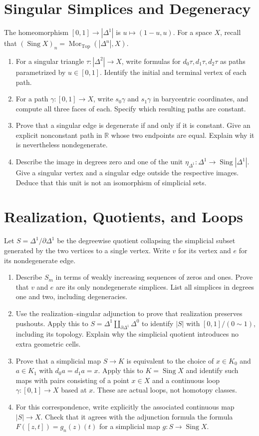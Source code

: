 \documentclass[11pt]{article}
\newcounter{result}[section]
\newcommand{\R}{\mathbb R}
\newcommand{\Top}{\mathrm{Top}}
\newcommand{\Sing}{\operatorname{Sing}}
\newcommand{\Mor}{\operatorname{Mor}}
\begin{document}
\section{Singular Simplices and Degeneracy}\label{ex:singular}
The homeomorphism $[0,1]\to|\Delta^1|$ is $u\mapsto(1-u,u)$.
For a space $X$, recall that $(\Sing X)_n=\Mor_\Top(|\Delta^n|,X)$.
\begin{enumerate}
\item For a singular triangle $\tau:|\Delta^2|\to X$, write formulas
for $d_0\tau,d_1\tau,d_2\tau$ as paths parametrized by $u\in[0,1]$.
Identify the initial and terminal vertex of each path.
\item For a path $\gamma:[0,1]\to X$, write $s_0\gamma$ and
$s_1\gamma$ in barycentric coordinates, and compute all three faces
of each. Specify which resulting paths are constant.
\item Prove that a singular edge is degenerate if and only if it is
constant. Give an explicit nonconstant path in $\R$ whose two endpoints
are equal. Explain why it is nevertheless nondegenerate.
\item Describe the image in degrees zero and one of the unit
$\eta_{\Delta^1}:\Delta^1\to\Sing|\Delta^1|$. Give a singular vertex
and a singular edge outside the respective images. Deduce that this
unit is not an isomorphism of simplicial sets.
\end{enumerate}


\section{Realization, Quotients, and Loops}\label{ex:realization}
Let $S=\Delta^1/\partial\Delta^1$ be the degreewise quotient collapsing
the simplicial subset generated by the two vertices to a single vertex.
Write $v$ for its vertex and $e$ for its nondegenerate edge.
\begin{enumerate}
\item Describe $S_m$ in terms of weakly increasing sequences of zeros
and ones. Prove that $v$ and $e$ are its only nondegenerate simplices.
List all simplices in degrees one and two, including degeneracies.
\item Use the realization--singular adjunction to prove that realization
preserves pushouts. Apply this to
$S=\Delta^1\amalg_{\partial\Delta^1}\Delta^0$ to identify $|S|$
with $[0,1]/(0\sim1)$, including its topology. Explain why the
simplicial quotient introduces no extra geometric cells.
\item Prove that a simplicial map $S\to K$ is equivalent to the choice
of $x\in K_0$ and $a\in K_1$ with $d_0a=d_1a=x$.
Apply this to $K=\Sing X$ and identify such maps with pairs consisting
of a point $x\in X$ and a continuous loop $\gamma:[0,1]\to X$
based at $x$. These are actual loops, not homotopy classes.
\item For this correspondence, write explicitly the associated continuous
map $|S|\to X$. Check that it agrees with the adjunction formula
the formula $F([z,t])=g_n(z)(t)$ for a simplicial map $g:S\to\Sing X$.
\end{enumerate}
\end{document}
